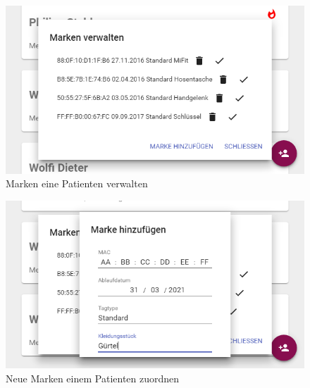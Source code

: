 \begin{figure}
	\centering
	\includegraphics[width=1.0\linewidth]{images/ui/markenverwalten}
	\caption{Marken eine Patienten verwalten}
	\label{img:ui/markenverwalten}
\end{figure}

\begin{figure}
	\centering
	\includegraphics[width=1.0\linewidth]{images/ui/markehinzufuegen}
	\caption{Neue Marken einem Patienten zuordnen}
	\label{img:ui/markehinzufuegen}
\end{figure}



